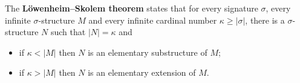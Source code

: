 The \textbf{Löwenheim–Skolem theorem} states that for every signature $\sigma$, 
every infinite $\sigma$-structure $M$ and every infinite cardinal number $\kappa \ge |\sigma|$, 
there is a $\sigma$-structure $N$ such that $|N| = \kappa$ and

\begin{itemize}
\item if $\kappa < |M|$ then $N$ is an elementary substructure of $M$;
\item if $\kappa > |M|$ then $N$ is an elementary extension of $M$.
\end{itemize}
